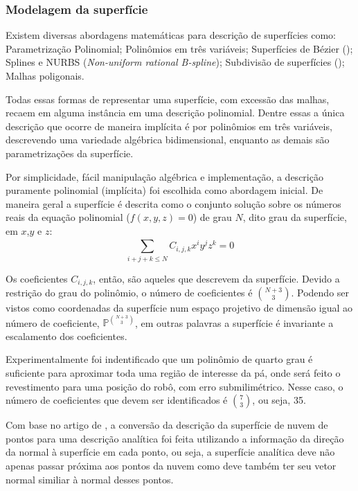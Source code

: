\subsubsection{Modelagem da superfície}\label{modelagem}

Existem diversas abordagens matemáticas para descrição de superfícies como:
Parametriza\-ção Polinomial; Polinômios em três variáveis; Superfícies de
Bézier (\cite{farin2002curves}); Splines e NURBS (\textit{Non-uniform
rational B-spline}); Subdivisão de superfícies (\cite{peters2008subdivision}); Malhas
poligonais.

Todas essas formas de representar uma superfície, com excessão das malhas,
recaem em alguma instância em uma descrição polinomial. Dentre essas a única
descrição que ocorre de maneira implícita é por polinômios em três variáveis,
descrevendo uma variedade algébrica bidimensional, enquanto as demais são
parametrizações da superfície. 

Por simplicidade, fácil manipulação algébrica e implementação, a descrição
puramente polinomial (implícita) foi escolhida como abordagem inicial. De
maneira geral a superfície é descrita como o conjunto solução sobre os
números reais da equação polinomial ($f(x,y,z)=0$) de grau $N$, dito grau da
superfície, em $x$,$y$ e $z$:
\[\sum\limits_{i+j+k \leq N}^{} C_{i,j,k}x^iy^jz^k = 0\]

Os coeficientes $C_{i,j,k}$, então, são aqueles que descrevem da superfície.
Devido a restrição do grau do polinômio, o número de coeficientes é
$\binom{N+3}{3}$. Podendo ser vistos como coordenadas da superfície num espaço
projetivo de dimensão igual ao número de coeficiente,
$\mathbb{P}^{\binom{N+3}{3}}$, em outras palavras a superfície é invariante a
escalamento dos coeficientes.

Experimentalmente foi indentificado que um polinômio de quarto grau é suficiente
para aproximar toda uma região de interesse da pá, onde será feito o revestimento
para uma posição do robô, com erro submilimétrico. Nesse caso, o número de
coeficientes que devem ser identificados é $\binom{7}{3}$, ou seja, 35.

Com base no artigo de \cite{juttler2002least}, a conversão da descrição da
superfície de nuvem de pontos para uma descrição analítica foi feita utilizando
a informação da direção da normal à superfície em cada ponto, ou seja, a superfície analítica deve não apenas passar
próxima aos pontos da nuvem como deve também ter seu vetor normal similiar à
normal desses pontos.

